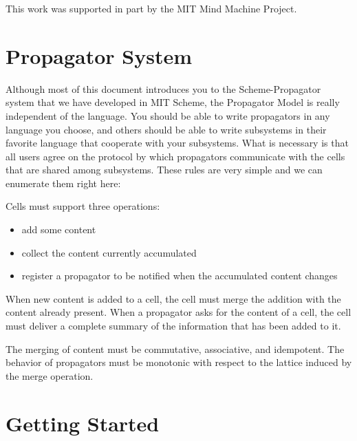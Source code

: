 \documentclass[12pt,letterpaper,english]{article}
\begin{document}
This work was supported in part by the MIT Mind Machine Project.

\tableofcontents


\section{Propagator System}
\label{propagator-system}

Although most of this document introduces you to the Scheme-Propagator
system that we have developed in MIT Scheme, the Propagator Model is
really independent of the language.  You should be able to write
propagators in any language you choose, and others should be able to
write subsystems in their favorite language that cooperate with your
subsystems.  What is necessary is that all users agree on the protocol
by which propagators communicate with the cells that are shared among
subsystems.  These rules are very simple and we can enumerate them
right here:

Cells must support three operations:
\begin{itemize}
\item {} 
add some content

\item {} 
collect the content currently accumulated

\item {} 
register a propagator to be notified when the accumulated content changes

\end{itemize}

When new content is added to a cell, the cell must merge the addition
with the content already present.  When a propagator asks for the
content of a cell, the cell must deliver a complete summary of the
information that has been added to it.

The merging of content must be commutative, associative, and
idempotent.  The behavior of propagators must be monotonic with
respect to the lattice induced by the merge operation.



\section{Getting Started}
\label{getting-started}
\end{document}
